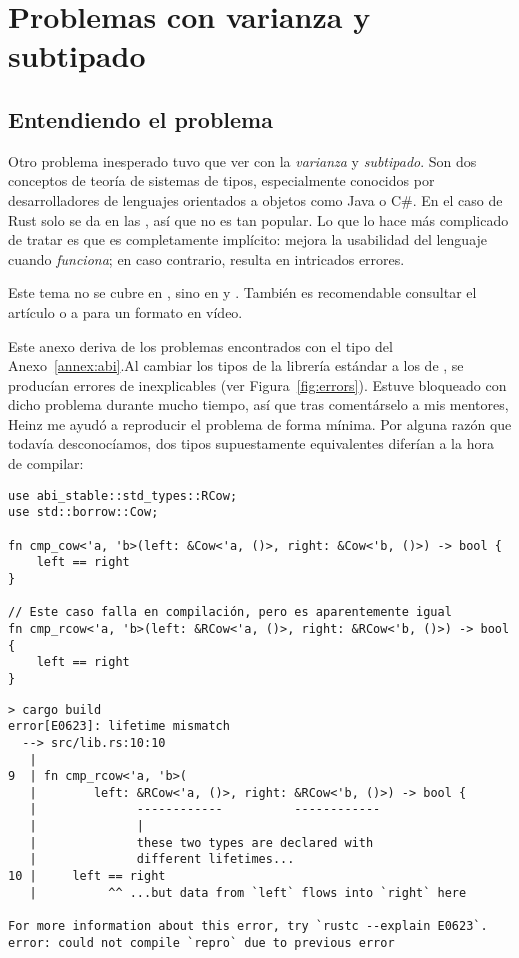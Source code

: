 \chapter{Problemas con varianza y subtipado}\label{annex:covariance}

\section{Entendiendo el problema}

Otro problema inesperado tuvo que ver con la \emph{varianza} y \emph{subtipado}.
Son dos conceptos de teoría de sistemas de tipos, especialmente conocidos por
desarrolladores de lenguajes orientados a objetos como Java o C\#. En el caso de
Rust solo se da en las \lifetimes, así que no es tan popular. Lo que lo hace más
complicado de tratar es que es completamente implícito: mejora la usabilidad del
lenguaje cuando \emph{funciona}; en caso contrario, resulta en intricados
errores.

Este tema no se cubre en , sino en  y . También es
recomendable consultar el artículo  o a
\textcite{video_covandcontra} para un formato en vídeo.

Este anexo deriva de los problemas encontrados con el tipo  del
Anexo~\ref{annex:abi}.Al cambiar los tipos de la librería estándar a los de
\abistable, se producían errores de \lifetimes inexplicables (ver
Figura~\ref{fig:errors}). Estuve bloqueado con dicho problema durante mucho
tiempo, así que tras comentárselo a mis mentores, Heinz me ayudó a reproducir el
problema de forma mínima. Por alguna razón que todavía desconocíamos, dos tipos
supuestamente equivalentes diferían a la hora de compilar:

\begin{verbatim}
use abi_stable::std_types::RCow;
use std::borrow::Cow;

fn cmp_cow<'a, 'b>(left: &Cow<'a, ()>, right: &Cow<'b, ()>) -> bool {
    left == right
}

// Este caso falla en compilación, pero es aparentemente igual
fn cmp_rcow<'a, 'b>(left: &RCow<'a, ()>, right: &RCow<'b, ()>) -> bool {
    left == right
}
\end{verbatim}

\begin{verbatim}
> cargo build
error[E0623]: lifetime mismatch
  --> src/lib.rs:10:10
   |
9  | fn cmp_rcow<'a, 'b>(
   |        left: &RCow<'a, ()>, right: &RCow<'b, ()>) -> bool {
   |              ------------          ------------
   |              |
   |              these two types are declared with
   |              different lifetimes...
10 |     left == right
   |          ^^ ...but data from `left` flows into `right` here

For more information about this error, try `rustc --explain E0623`.
error: could not compile `repro` due to previous error
\end{verbatim}

